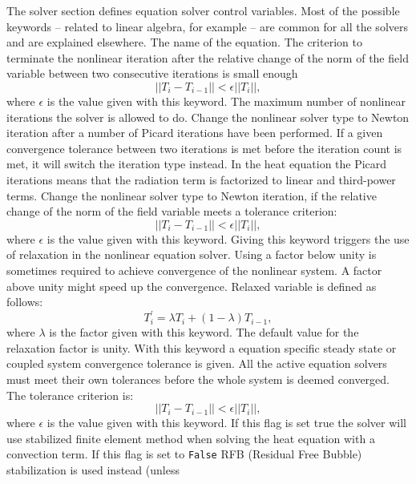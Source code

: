 The solver section defines equation solver control variables. Most of the possible
keywords -- related to linear algebra, for example -- are common for all the solvers and are 
explained elsewhere.
\sifbegin
{}
The name of the equation.
The criterion to
terminate the nonlinear iteration after the relative change of the norm of the field variable
between two consecutive iterations is small enough
$$
 ||T_i-T_{i-1}|| < \epsilon ||T_i||,
$$
where $\epsilon$ is the value given with this keyword.
The maximum number of nonlinear iterations the
solver is allowed to do.
Change the nonlinear solver type to
Newton iteration after a number of Picard iterations have been performed. If a given
convergence tolerance between two iterations is met before the iteration count is met,
it will switch the iteration type instead. In the heat equation the Picard iterations 
means that the radiation term is factorized to linear and third-power terms.
Change the nonlinear solver type to
Newton iteration, if the relative change of the norm of the field variable meets a
tolerance criterion:
$$
 ||T_i-T_{i-1}|| < \epsilon ||T_i||,
$$
where $\epsilon$ is the value given with this keyword.
Giving this keyword triggers the use
of  relaxation in the nonlinear equation solver.
Using a factor below unity is sometimes required to achieve convergence of the nonlinear system.
A factor above unity might speed up the convergence. Relaxed variable is defined as follows:
$$
 T^{'}_i = \lambda T_i + (1-\lambda) T_{i-1},
$$
where $\lambda$ is the factor given with this keyword. The default value for the relaxation factor
is unity.
With this keyword a equation specific steady state or coupled system
convergence tolerance is given.
All the active equation solvers must meet their own tolerances before the 
whole system is deemed converged.
The tolerance criterion is:
$$
 ||T_i-T_{i-1}|| < \epsilon ||T_i||,
$$
where $\epsilon$ is the value given with this keyword.
If this flag is set true the solver will use stabilized finite element method
when solving the heat equation with a convection term. If this flag is set to
{\tt False} RFB (Residual Free Bubble) stabilization is used instead (unless
